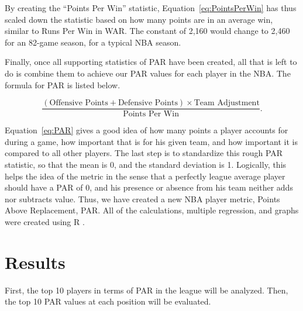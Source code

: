 \documentclass[12pt]{article}
\begin{document}
By creating the ``Points Per Win'' statistic, Equation~\eqref{eq:PointsPerWin} 
has thus scaled down the statistic based 
on how many points are in an average win, similar to Runs Per Win in 
WAR. The constant of 2,160 would change to 2,460 for an 82-game 
season, for a typical NBA season.

Finally, once all supporting statistics of PAR have been created, all that is left to 
do is combine them to achieve our PAR values for each player in the 
NBA. The formula for PAR is listed below.

\begin{equation}
 \label{eq:PAR}
  \frac{(\text{Offensive Points} + \text{Defensive Points}) \times \text{Team Adjustment}}
  {\text{Points Per Win}}.
\end{equation}

Equation~\eqref{eq:PAR} gives a good idea of how many points a player 
accounts for 
during a 
game, how important that is for 
his given team, and how important it is compared to all other players. The 
last step is to standardize this 
 rough PAR statistic, so that the mean is 0, and the standard deviation is 
1. 
Logically, this helps the idea of the 
metric in the sense that a perfectly league average player should have a 
PAR of 0, and his presence or 
absence from his team neither adds nor subtracts value. Thus, we have 
created a new NBA player metric, 
Points Above Replacement, PAR. All of the calculations, multiple 
regression, and graphs were created using R \citep{R}.
 
 
\section{Results}
First, the top 10 players in terms of PAR in the league will be analyzed. Then, the top 10 PAR values at each position will be evaluated.
\end{document}
